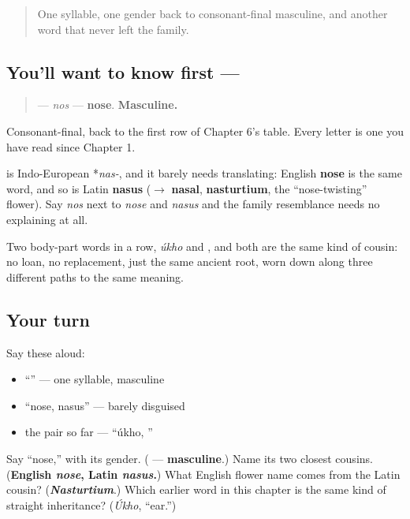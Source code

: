 \label{lesson:RU-C09-nos}



\begin{quote}
One syllable, one gender back to consonant-final masculine, and another word that never left the family.
\end{quote}

\subsection*{You'll want to know first — }
\begin{quote}
\textbf{} — \emph{nos} — \textbf{nose}. \textbf{Masculine.}
\end{quote}

Consonant-final, back to the first row of Chapter 6's table. Every letter is one you have read since Chapter 1.

\begin{cousinweb}
\textbf{} is Indo-European *\emph{nas-}, and it barely needs translating: English \textbf{nose} is the same word, and so is Latin \textbf{nasus} ($\to$ \textbf{nasal}, \textbf{nasturtium}, the \textquotedblleft{}nose-twisting\textquotedblright{} flower). Say \emph{nos} next to \emph{nose} and \emph{nasus} and the family resemblance needs no explaining at all.

Two body-part words in a row, \emph{úkho} and \emph{}, and both are the same kind of cousin: no loan, no replacement, just the same ancient root, worn down along three different paths to the same meaning.
\end{cousinweb}

\subsection*{Your turn}
Say these aloud:

\begin{itemize}
\raggedright
  \item \textquotedblleft{}\textquotedblright{} — one syllable, masculine
  \item \textquotedblleft{}nose, nasus\textquotedblright{} — barely disguised
  \item the pair so far — \textquotedblleft{}úkho, \textquotedblright{}
\end{itemize}

\begin{tcolorbox}[breakable,colback=teal!4,colframe=teal!35!black,title={Before you move on}]
Say \textquotedblleft{}nose,\textquotedblright{} with its gender. (\textbf{} — \textbf{masculine}.) Name its two closest cousins. (\textbf{English \emph{nose}, Latin \emph{nasus}.}) What English flower name comes from the Latin cousin? (\emph{\textbf{Nasturtium}}.) Which earlier word in this chapter is the same kind of straight inheritance? (\emph{Úkho}, \textquotedblleft{}ear.\textquotedblright{})
\end{tcolorbox}
